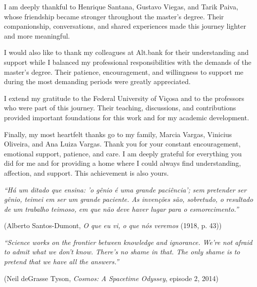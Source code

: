 \begin{agradecimentos}
        I am deeply thankful to Henrique Santana, Gustavo Viegas, and Tarik Paiva, whose friendship became stronger
        throughout the master’s degree. Their companionship, conversations, and shared experiences made this journey
        lighter and more meaningful.

        I would also like to thank my colleagues at Alt.bank for their understanding and support while I balanced my
        professional responsibilities with the demands of the master’s degree. Their patience, encouragement, and
        willingness to support me during the most demanding periods were greatly appreciated.

        I extend my gratitude to the Federal University of Viçosa and to the professors who were part of this journey.
        Their teaching, discussions, and contributions provided important foundations for this work and for my academic
        development.

        Finally, my most heartfelt thanks go to my family, Marcia Vargas, Vinicius Oliveira, and Ana Luiza Vargas. Thank
        you for your constant encouragement, emotional support, patience, and care. I am deeply grateful for everything
        you did for me and for providing a home where I could always find understanding, affection, and support. This
        achievement is also yours.
    \end{agradecimentos}

    \begin{epigrafe}
        \vspace*{\fill}
        \begin{flushright}
            \singlespacing\itshape
            ``Há um ditado que ensina: 'o gênio é uma grande paciência'; sem pretender ser gênio, teimei em ser um
            grande paciente. As invenções são, sobretudo, o resultado de um trabalho teimoso, em que não deve haver
            lugar para o esmorecimento.''
            \par\vspace{0.3cm}\upshape
            (Alberto Santos-Dumont, \textit{O que eu vi, o que nós veremos} (1918, p. 43))
        \end{flushright}
        \vspace{1.5cm}
        \begin{flushright}
            \singlespacing\itshape
            ``Science works on the frontier between knowledge and ignorance. We're not afraid to
            admit what we don't know. There's no shame in that. The only shame is to pretend that
            we have all the answers.''
            \par\vspace{0.3cm}\upshape
            (Neil deGrasse Tyson, \textit{Cosmos: A Spacetime Odyssey}, episode 2, 2014)
        \end{flushright}
    \end{epigrafe}
    \fi

